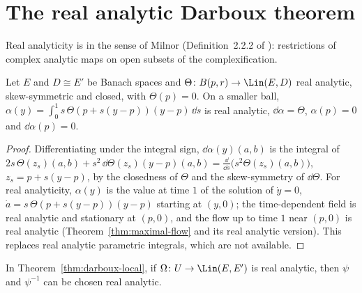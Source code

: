 \section{The real analytic Darboux theorem}
\label{sec:darboux-analytic}

Real analyticity is in the sense of Milnor (Definition~2.2.2 of \cite{GN26}): restrictions of
complex analytic maps on open subsets of the complexification.

\begin{lemma}
  \label{lem:primitive-analytic}
  \leanok
  Let $E$ and $D \cong E'$ be Banach spaces and $\Theta \colon B(p, r) \to \Lin(E, D)$ real
  analytic, skew-symmetric and closed, with $\Theta(p) = 0$. On a smaller ball,
  $\alpha(y) = \int_0^1 s\, \Theta(p + s(y - p))(y - p)\, \dd s$ is real analytic, $\dd\alpha =
  \Theta$, $\alpha(p) = 0$ and $\dd\alpha(p) = 0$.
\end{lemma}

\begin{proof}
  \leanok
  Differentiating under the integral sign, $\dd\alpha(y)(a, b)$ is the integral of $2s\,
  \Theta(z_s)(a, b) + s^2\, \dd\Theta(z_s)(y - p)(a, b) = \frac{\dd}{\dd s}\bigl(s^2
  \Theta(z_s)(a, b)\bigr)$, $z_s = p + s(y - p)$, by the closedness of $\Theta$ and the skew-symmetry
  of $\dd\Theta$. For real analyticity, $\alpha(y)$ is the value at time $1$ of the solution of
  $\dot y = 0$, $\dot a = s\, \Theta(p + s(y - p))(y - p)$ starting at $(y, 0)$; the time-dependent
  field is real analytic and stationary at $(p, 0)$, and the flow up to time $1$ near $(p, 0)$ is
  real analytic (Theorem~\ref{thm:maximal-flow} and its real analytic version). This replaces real
  analytic parametric integrals, which are not available.
\end{proof}

\begin{theorem}
  \label{thm:darboux-local-analytic}
  \leanok
  In Theorem~\ref{thm:darboux-local}, if $\Omega \colon U \to \Lin(E, E')$ is real analytic, then
  $\psi$ and $\psi^{-1}$ can be chosen real analytic.
\end{theorem}

